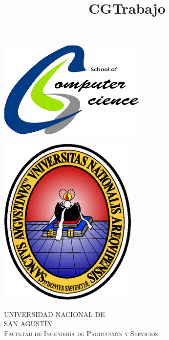 \documentclass[11pt]{article}
\title{CG}
\title{Trabajo}
\begin{document}
\begin{center}																		%
\newcommand{\HRule}{\rule{\linewidth}{0.5mm}}									%
\begin{minipage}{0.5\textwidth} \begin{flushleft}
\includegraphics[scale = 0.4]{img/cslogo.png}
\end{flushleft}\end{minipage}
\begin{minipage}{0.48\textwidth} \begin{flushright}
\includegraphics[scale = 0.3]{img/logounsa.png}
\end{flushright}\end{minipage}

\vspace*{-1.5cm}								%
\textsc{\huge UNIVERSIDAD NACIONAL DE\\ SAN AGUSTÍN \vspace{5px}}\\[1.5cm]	

\textsc{\LARGE Facultad de Ingeniería de Producción y Servicios}\\[1.5cm]													%


\end{center}
\end{document}
